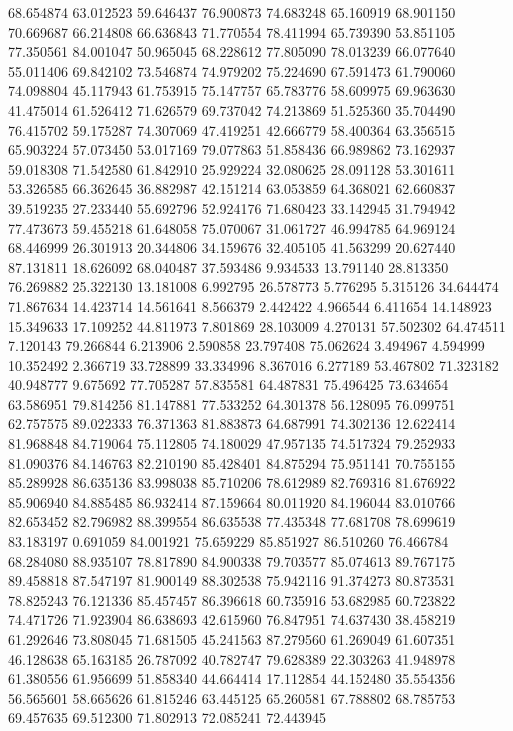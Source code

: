 68.654874
63.012523
59.646437
76.900873
74.683248
65.160919
68.901150
70.669687
66.214808
66.636843
71.770554
78.411994
65.739390
53.851105
77.350561
84.001047
50.965045
68.228612
77.805090
78.013239
66.077640
55.011406
69.842102
73.546874
74.979202
75.224690
67.591473
61.790060
74.098804
45.117943
61.753915
75.147757
65.783776
58.609975
69.963630
41.475014
61.526412
71.626579
69.737042
74.213869
51.525360
35.704490
76.415702
59.175287
74.307069
47.419251
42.666779
58.400364
63.356515
65.903224
57.073450
53.017169
79.077863
51.858436
66.989862
73.162937
59.018308
71.542580
61.842910
25.929224
32.080625
28.091128
53.301611
53.326585
66.362645
36.882987
42.151214
63.053859
64.368021
62.660837
39.519235
27.233440
55.692796
52.924176
71.680423
33.142945
31.794942
77.473673
59.455218
61.648058
75.070067
31.061727
46.994785
64.969124
68.446999
26.301913
20.344806
34.159676
32.405105
41.563299
20.627440
87.131811
18.626092
68.040487
37.593486
9.934533
13.791140
28.813350
76.269882
25.322130
13.181008
6.992795
26.578773
5.776295
5.315126
34.644474
71.867634
14.423714
14.561641
8.566379
2.442422
4.966544
6.411654
14.148923
15.349633
17.109252
44.811973
7.801869
28.103009
4.270131
57.502302
64.474511
7.120143
79.266844
6.213906
2.590858
23.797408
75.062624
3.494967
4.594999
10.352492
2.366719
33.728899
33.334996
8.367016
6.277189
53.467802
71.323182
40.948777
9.675692
77.705287
57.835581
64.487831
75.496425
73.634654
63.586951
79.814256
81.147881
77.533252
64.301378
56.128095
76.099751
62.757575
89.022333
76.371363
81.883873
64.687991
74.302136
12.622414
81.968848
84.719064
75.112805
74.180029
47.957135
74.517324
79.252933
81.090376
84.146763
82.210190
85.428401
84.875294
75.951141
70.755155
85.289928
86.635136
83.998038
85.710206
78.612989
82.769316
81.676922
85.906940
84.885485
86.932414
87.159664
80.011920
84.196044
83.010766
82.653452
82.796982
88.399554
86.635538
77.435348
77.681708
78.699619
83.183197
0.691059
84.001921
75.659229
85.851927
86.510260
76.466784
68.284080
88.935107
78.817890
84.900338
79.703577
85.074613
89.767175
89.458818
87.547197
81.900149
88.302538
75.942116
91.374273
80.873531
78.825243
76.121336
85.457457
86.396618
60.735916
53.682985
60.723822
74.471726
71.923904
86.638693
42.615960
76.847951
74.637430
38.458219
61.292646
73.808045
71.681505
45.241563
87.279560
61.269049
61.607351
46.128638
65.163185
26.787092
40.782747
79.628389
22.303263
41.948978
61.380556
61.956699
51.858340
44.664414
17.112854
44.152480
35.554356
56.565601
58.665626
61.815246
63.445125
65.260581
67.788802
68.785753
69.457635
69.512300
71.802913
72.085241
72.443945

